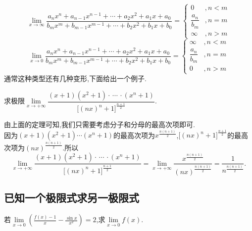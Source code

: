 \theorem[分数型极限]
\begin{equation}
	\lim\limits_{x \to \infty}\frac{a_nx^n+a_{n-1}x^{n-1}+\cdots+a_2x^2+a_1x+a_0}{b_mx^m+b_{m-1}x^{m-1}+\cdots+b_2x^2+b_1x+b_0}=
	\begin{cases}
		0&,n<m\\
		\dfrac{a_n}{b_m}&,n=m\\
		\infty&,n>m
	\end{cases}
\end{equation}
\begin{equation}
	\lim\limits_{x \to 0}\frac{a_nx^n+a_{n-1}x^{n-1}+\cdots+a_2x^2+a_1x+a_0}{b_mx^m+b_{m-1}x^{m-1}+\cdots+b_2x^2+b_1x+b_0}=
	\begin{cases}
		\infty&,n<m\\
		\dfrac{a_n}{b_m}&,n=m\\
		0&,n>m
	\end{cases}
\end{equation}
通常这种类型还有几种变形,下面给出一个例子.

\examples 求极限$\lim\limits_{x \to +\infty}\dfrac{(x+1)(x^2+1)\cdot\,\cdots\,\cdot(x^n+1)}{\big[(nx)^n+1\big]^{\frac{n+1}{2}}}$.

\solve 由上面的定理可知,我们只需要考虑分子和分母的最高次项即可.\\[0.5em]
因为$(x+1)(x^2+1)\cdots(x^n+1)$的最高次项为$\displaystyle x^{\frac{n(n+1)}{2}}$,$\big[(nx)^n+1\big]^{\frac{n+1}{2}}$的最高次项为$\displaystyle (nx)^{\frac{n(n+1)}{2}}$.所以
\[
\lim\limits_{x \to +\infty}\dfrac{(x+1)(x^2+1)\cdot\,\cdots\,\cdot(x^n+1)}{\big[(nx)^n+1\big]^{\frac{n+1}{2}}}=\lim\limits_{x \to +\infty}\dfrac{x^{\frac{n(n+1)}{2}}}{(nx)^{\frac{n(n+1)}{2}}}=\frac{1}{n^{\frac{n(n+1)}{2}}}.
\]

\vspace*{-2em}

\subsection{已知一个极限式求另一极限式}
\examples 若$\displaystyle \lim\limits_{x \to 0}\left(\frac{f(x)-1}{x}-\frac{\sin x}{x^2}\right)=2$,求$\lim\limits_{x \to 0}f(x).$

